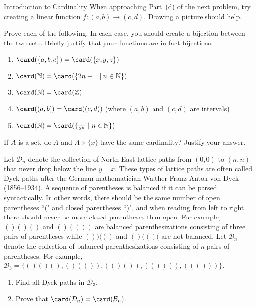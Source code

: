 \begin{section}{Introduction to Cardinality}
When approaching Part~(d) of the next problem, try creating a linear function $f:(a,b)\to (c,d)$. Drawing a picture should help.

\begin{problem}\label{prob:cardinalityPractice}
Prove each of the following. In each case, you should create a bijection between the two sets. Briefly justify that your functions are in fact bijections.
\begin{enumerate}[label=\textrm{(\alph*)}]
\item $\card(\{a,b,c\})=\card(\{x,y,z\})$
\item $\card(\mathbb{N})=\card(\{2n+1\mid n\in \mathbb{N}\})$
\item $\card(\mathbb{N})=\card(\mathbb{Z})$
\item $\card((a,b))=\card((c,d))$ (where $(a,b)$ and $(c,d)$ are intervals)
\item $\card(\mathbb{N})=\card(\{\frac{1}{2^n}\mid n\in \mathbb{N}\})$
\end{enumerate}
\end{problem}

\begin{problem}
If $A$ is a set, do $A$ and $A\times \{x\}$ have the same cardinality?  Justify your answer.
\end{problem}

\begin{problem}
Let $\mathcal{D}_n$ denote the collection of North-East lattice paths from $(0,0)$ to $(n,n)$ that never drop below the line $y=x$.  These types of lattice paths are often called Dyck paths after the German mathematician Walther Franz Anton von Dyck (1856--1934). A sequence of parentheses is balanced if it can be parsed syntactically. In other words, there should be the same number of open parentheses ``(" and closed parentheses ``)", and when reading from left to right there should never be more closed parentheses than open. For example, $()()()$ and $()(())$ are balanced parenthesizations consisting of three pairs of parentheses while $())(()$ and $()(()($ are not balanced. Let $\mathcal{B}_n$ denote the collection of balanced parenthesizations consisting of $n$ pairs of parentheses.  For example, $\mathcal{B}_3=\{()()(), ()(()), (()()), (())(), ((()))\}$.
\begin{enumerate}[label=\textrm{(\alph*)}]
\item Find all Dyck paths in $\mathcal{D}_3$.
\item Prove that $\card(\mathcal{D}_n)=\card(\mathcal{B}_n)$.
\end{enumerate}
\end{problem}


\end{section}
